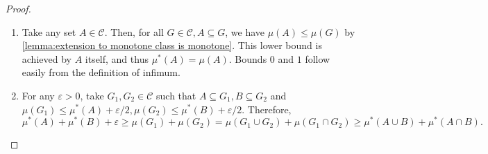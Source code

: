 \begin{proof}
	\begin{enumerate}
		\item Take any set \(A\in\mathcal{C}\). Then, for all \(G\in\mathcal{C},A\subseteq G\), we
have \(\mu(A)\leq\mu(G)\) by \ref{lemma:extension to monotone class is
monotone}.  This lower bound is achieved by \(A\) itself, and thus
\(\mu^*(A)=\mu(A)\). Bounds \(0\) and \(1\) follow easily from the definition of
infimum.
		\item For any \(\varepsilon>0\), take \(G_1,G_2\in\mathcal{C}\) such that
\(A\subseteq G_1,B\subseteq G_2\) and
\(\mu(G_1)\leq\mu^*(A)+\varepsilon/2,\mu(G_2)\leq\mu^*(B)+\varepsilon/2\).
Therefore,
		\[\mu^*(A)+\mu^*(B)+\varepsilon\geq\mu(G_1)+\mu(G_2)=\mu(G_1\cup G_2)+\mu(G_1\cap G_2)\geq\mu^*(A\cup B)+\mu^*(A\cap B).\]
		

\end{enumerate}
\end{proof}
